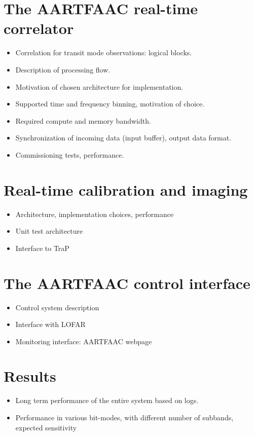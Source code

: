 \documentclass{aa}
\begin{document}
\section {\label{sec:gpucorr} The AARTFAAC real-time correlator}
\begin {itemize}
 \item {Correlation for transit mode observations: logical blocks.}
 \item {Description of processing flow.} 
 \item {Motivation of chosen architecture for implementation.}
 \item {Supported time and frequency binning, motivation of choice.}
 \item {Required compute and memory bandwidth.}
 \item {Synchronization of incoming data (input buffer), output data format.}
 \item {Commissioning tests, performance.}
\end {itemize}

\section {\label{sec:calim} Real-time calibration and imaging}
\begin {itemize}
 \item {Architecture, implementation choices, performance}
 \item {Unit test architecture}
 \item {Interface to TraP}
\end {itemize}

\section {\label{sec:acontrol} The AARTFAAC control interface}
\begin {itemize}
 \item {Control system description}
 \item {Interface with LOFAR}
 \item {Monitoring interface: AARTFAAC webpage}
\end {itemize}

\section {\label{sec:results} Results}
\begin {itemize}
 \item {Long term performance of the entire system based on logs.}
 \item {Performance  in various  bit-modes, with  different number  of subbands,
   expected sensitivity}
\end {itemize}
\end{document}
